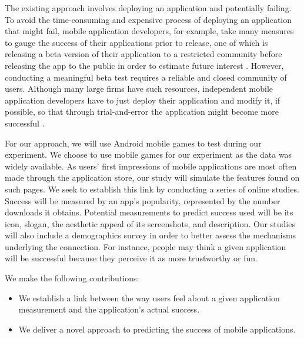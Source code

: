 The existing approach involves deploying an application and potentially failing. To avoid the time-consuming and expensive process of deploying an application that might fail, mobile application developers, for example, take many measures to gauge the success of their applications prior to release, one of which is releasing a beta version of their application to a restricted community before releasing the app to the public in order to estimate future interest \cite{betatest}. However, conducting a meaningful beta test requires a reliable and closed community of users. Although many large firms have such resources, independent mobile application developers have to just deploy their application and modify it, if possible, so that through trial-and-error the application might become more successful \cite{betatest}.

For our approach, we will use Android mobile games to test during our experiment. We choose to use mobile games for our experiment as the data was widely available. As users' first impressions of mobile applications are most often made through the application store, our study will simulate the features found on such pages. We seek to establish this link by conducting a series of online studies. Success will be measured by an app's popularity, represented by the number downloads it obtains. Potential measurements to predict success used will be its icon, slogan, the aesthetic appeal of its screenshots, and description. Our studies will also include a demographics survey in order to better assess the mechanisms underlying the connection. For instance, people may think a given application will be successful because they perceive it as more trustworthy or fun.

We make the following contributions:
\begin{itemize}
\item We establish a link between the way users feel about a given application measurement and the application's actual success.
\item We deliver a novel approach to predicting the success of mobile applications.
\end{itemize}


